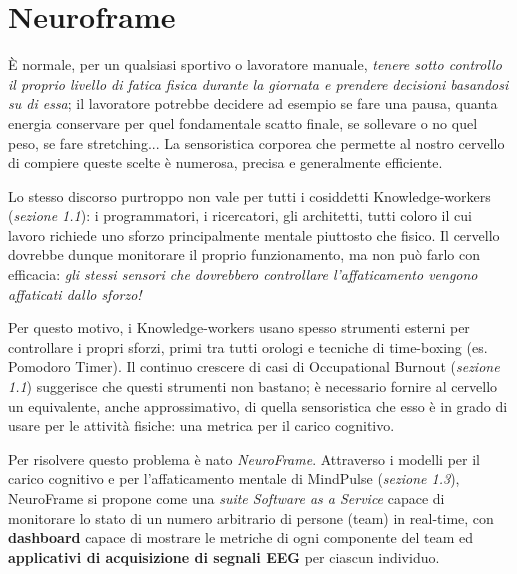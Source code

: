 \section{Neuroframe}
È normale, per un qualsiasi sportivo o lavoratore manuale, \emph{tenere sotto controllo il proprio livello di fatica fisica durante la giornata e prendere decisioni basandosi su di essa}; il lavoratore potrebbe decidere ad esempio se fare una pausa, quanta energia conservare per quel fondamentale scatto finale, se sollevare o no quel peso, se fare stretching...\newline
La sensoristica corporea che permette al nostro cervello di compiere queste scelte è numerosa, precisa e generalmente efficiente.\newline

\noindent Lo stesso discorso purtroppo non vale per tutti i cosiddetti Knowledge-workers (\emph{sezione 1.1}): i programmatori, i ricercatori, gli architetti, tutti coloro il cui lavoro richiede uno sforzo principalmente mentale piuttosto che fisico.\newline
Il cervello dovrebbe dunque monitorare il proprio funzionamento, ma non può farlo con efficacia: \emph{gli stessi sensori che dovrebbero controllare l'affaticamento vengono affaticati dallo sforzo!}\newline

\noindent Per questo motivo, i Knowledge-workers usano spesso strumenti esterni per controllare i propri sforzi, primi tra tutti orologi e tecniche di time-boxing (es. Pomodoro Timer).\newline
Il continuo crescere di casi di Occupational Burnout (\emph{sezione 1.1}) suggerisce che questi strumenti non bastano; è necessario fornire al cervello un equivalente, anche approssimativo, di quella sensoristica che esso è in grado di usare per le attività fisiche: una metrica per il carico cognitivo.\newline

\noindent Per risolvere questo problema è nato \emph{NeuroFrame}.\newline
Attraverso i modelli per il carico cognitivo e per l'affaticamento mentale di MindPulse (\emph{sezione 1.3}), NeuroFrame si propone come una \emph{suite Software as a Service} capace di monitorare lo stato di un numero arbitrario di persone (team) in real-time, con {\bf dashboard} capace di mostrare le metriche di ogni componente del team ed {\bf applicativi di acquisizione di segnali EEG} per ciascun individuo.\newline

